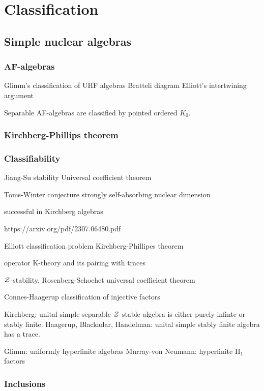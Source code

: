 \documentclass{../../large}
\begin{document}
\part{Classification}
\chapter{Simple nuclear algebras}


\section{AF-algebras}

Glimm's classification of UHF algebras
Bratteli diagram
Elliott's intertwining argument

Separable AF-algebras are classified by pointed ordered $K_0$.


\section{Kirchberg-Phillips theorem}

\section{Classifiability}
Jiang-Su stability
Universal coefficient theorem

Toms-Winter conjecture
strongly self-absorbing
nuclear dimension




successful in Kirchberg algebras


https://arxiv.org/pdf/2307.06480.pdf

Elliott classification problem
Kirchberg-Phillipes theorem

operator K-theory and its pairing with traces

$\mathcal{Z}$-stability, Rosenberg-Schochet universal coefficient theorem

Connes-Haagerup classification of injective factors

Kirchberg: unital simple separable $\mathcal{Z}$-stable algebra is either purely infinte or stably finite.
Haagerup, Blackadar, Handelman: unital simple stably finite algebra has a trace.

Glimm: uniformly hyperfinite algebras
Murray-von Neumann: hyperfinite II$_1$ factors




\section{Inclusions}
\end{document}
